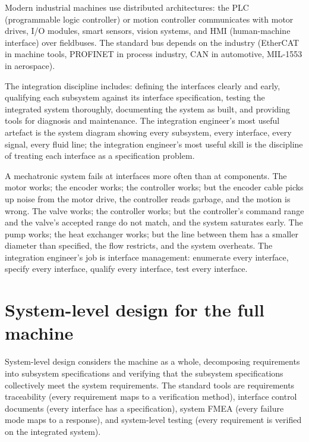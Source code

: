 Modern industrial machines use distributed architectures: the PLC (programmable logic controller) or motion controller communicates with motor drives, I/O modules, smart sensors, vision systems, and HMI (human-machine interface) over fieldbuses. The standard bus depends on the industry (EtherCAT in machine tools, PROFINET in process industry, CAN in automotive, MIL-1553 in aerospace).

The integration discipline includes: defining the interfaces clearly and early, qualifying each subsystem against its interface specification, testing the integrated system thoroughly, documenting the system as built, and providing tools for diagnosis and maintenance. The integration engineer's most useful artefact is the system diagram showing every subsystem, every interface, every signal, every fluid line; the integration engineer's most useful skill is the discipline of treating each interface as a specification problem.

\begin{archetype}
A mechatronic system fails at interfaces more often than at components. The motor works; the encoder works; the controller works; but the encoder cable picks up noise from the motor drive, the controller reads garbage, and the motion is wrong. The valve works; the controller works; but the controller's command range and the valve's accepted range do not match, and the system saturates early. The pump works; the heat exchanger works; but the line between them has a smaller diameter than specified, the flow restricts, and the system overheats. The integration engineer's job is interface management: enumerate every interface, specify every interface, qualify every interface, test every interface.
\end{archetype}

\section{System-level design for the full machine}

System-level design considers the machine as a whole, decomposing requirements into subsystem specifications and verifying that the subsystem specifications collectively meet the system requirements. The standard tools are requirements traceability (every requirement maps to a verification method), interface control documents (every interface has a specification), system FMEA (every failure mode maps to a response), and system-level testing (every requirement is verified on the integrated system).

